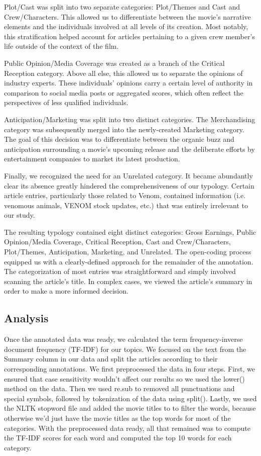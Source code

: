\documentclass[letterpaper]{article} %
\begin{document}
Plot/Cast was split into two separate categories: Plot/Themes and Cast and Crew/Characters. This allowed us to differentiate between the movie’s narrative elements and the individuals involved at all levels of its creation. Most notably, this stratification helped account for articles pertaining to a given crew member’s life outside of the context of the film. 

Public Opinion/Media Coverage was created as a branch of the Critical Reception category. Above all else, this allowed us to separate the opinions of industry experts. These individuals’ opinions carry a certain level of authority in comparison to social media posts or aggregated scores, which often reflect the perspectives of less qualified individuals. 

Anticipation/Marketing was split into two distinct categories. The Merchandising category was subsequently merged into the newly-created Marketing category. The goal of this decision was to differentiate between the organic buzz and anticipation surrounding a movie’s upcoming release and the deliberate efforts by entertainment companies to market its latest production. 

Finally, we recognized the need for an Unrelated category. It became abundantly clear its absence greatly hindered the comprehensiveness of our typology. Certain article entries, particularly those related to Venom, contained information (i.e. venomous animals, VENOM stock updates, etc.) that was entirely irrelevant to our study.

The resulting typology contained eight distinct categories: Gross Earnings, Public Opinion/Media Coverage, Critical Reception, Cast and Crew/Characters, Plot/Themes, Anticipation, Marketing, and Unrelated. The open-coding process equipped us with a clearly-defined approach for the remainder of the annotation. The categorization of most entries was straightforward and simply involved scanning the article's title. In complex cases, we viewed the article’s summary in order to make a more informed decision. 

\subsection{Analysis}

Once the annotated data was ready, we calculated the term frequency-inverse document frequency (TF-IDF) for our topics. We focused on the text from the Summary column in our data and split the articles according to their corresponding annotations. We first preprocessed the data in four steps. First, we ensured that case sensitivity wouldn't affect our results so we used the lower() method on the data. Then we used re.sub to removed all punctuations and special symbols, followed by tokenization of the data using split(). Lastly, we used the NLTK stopword file and added the movie titles to to filter the words, because otherwise we'd just have the movie titles as the top words for most of the categories. With the preprocessed data ready, all that remained was to compute the TF-IDF scores for each word and computed the top 10 words for each category. 
\end{document}
